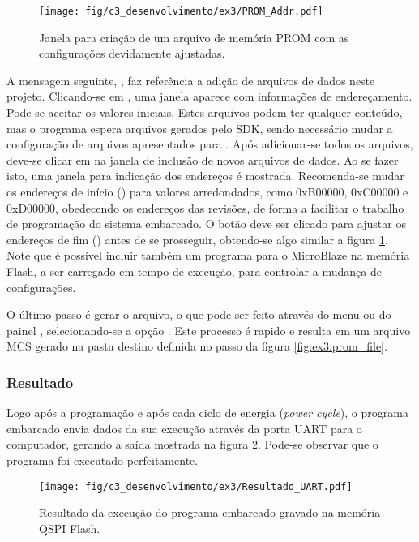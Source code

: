\documentclass[11pt,a4paper,oneside]{book}
\begin{document}
\begin{figure}[htp]
\centering
\texttt{[image: fig/c3\_desenvolvimento/ex3/PROM\_Addr.pdf]}
\caption{Janela para criação de um arquivo de memória PROM com as configurações devidamente ajustadas.}
\label{fig:ex3:prom_addr}
\end{figure}

A mensagem seguinte, , faz referência a adição de arquivos de dados neste projeto.
Clicando-se em , uma janela aparece com informações de endereçamento.
Pode-se aceitar os valores iniciais.
Estes arquivos podem ter qualquer conteúdo, mas o programa espera arquivos gerados pelo SDK, sendo necessário mudar a configuração de arquivos apresentados para .
Após adicionar-se todos os arquivos, deve-se clicar em  na janela de inclusão de novos arquivos de dados.
Ao se fazer isto, uma janela para indicação dos endereços é mostrada.
Recomenda-se mudar os endereços de início () para valores arredondados, como 0xB00000, 0xC00000 e 0xD00000, obedecendo os endereços das revisões, de forma a facilitar o trabalho de programação do sistema embarcado.
O botão  deve ser clicado para ajustar os endereços de fim () antes de se prosseguir, obtendo-se algo similar a figura \ref{fig:ex3:prom_addr}.
Note que é possível incluir também um programa para o MicroBlaze na memória Flash, a ser carregado em tempo de execução, para controlar a mudança de configurações.

O último passo é gerar o arquivo, o que pode ser feito através do menu  ou do painel , selecionando-se a opção .
Este processo é rapido e resulta em um arquivo MCS gerado na pasta destino definida no passo da figura \ref{fig:ex3:prom_file}.

\subsubsection{Resultado}
Logo após a programação e após cada ciclo de energia (\textit{power cycle}), o programa embarcado envia dados da sua execução através da porta UART para o computador, gerando a saída mostrada na figura \ref{fig:ex3:resultado}.
Pode-se observar que o programa foi executado perfeitamente.

\begin{figure}[htp]
\centering
\texttt{[image: fig/c3\_desenvolvimento/ex3/Resultado\_UART.pdf]}
\caption{Resultado da execução do programa embarcado gravado na memória QSPI Flash.}
\label{fig:ex3:resultado}
\end{figure}
\end{document}
